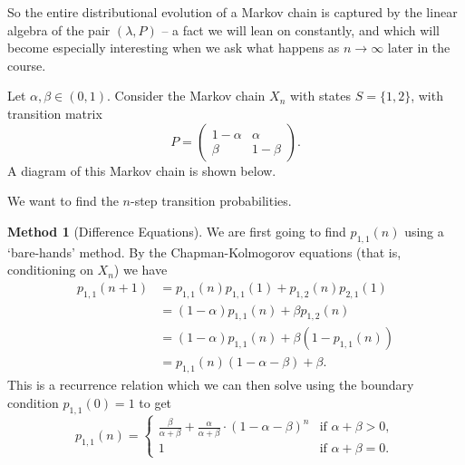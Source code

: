 So the entire distributional evolution of a Markov chain is captured by the linear algebra of the pair $(\lambda, P)$ -- a fact we will lean on constantly, and which will become especially interesting when we ask what happens as $n \rightarrow \infty$ later in the course.

\begin{example}
	Let $\alpha, \beta \in (0, 1)$. 
	Consider the Markov chain $X_n$ with states $S = \{1, 2\}$, with transition matrix 
	$$
	P = \begin{pmatrix}
		1 - \alpha & \alpha \\
		\beta & 1 - \beta
	\end{pmatrix}.
	$$
	A diagram of this Markov chain is shown below.
	\begin{center}
	\end{center}

	We want to find the $n$-step transition probabilities.

	\textbf{Method 1} (Difference Equations). We are first going to find $p_{1, 1}(n)$ using a `bare-hands' method. By the Chapman-Kolmogorov equations (that is, conditioning on $X_n$) we have
	\begin{align*}
		p_{1, 1}(n + 1) &= p_{1, 1}(n)p_{1, 1}(1) + p_{1, 2}(n) p_{2, 1}(1) \\
		&= (1 - \alpha)p_{1, 1}(n) + \beta p_{1, 2}(n) \\
		&= (1 - \alpha)p_{1, 1}(n) + \beta (1 - p_{1, 1}(n)) \\
		&= p_{1, 1}(n)(1 - \alpha - \beta) + \beta.
	\end{align*}
	This is a recurrence relation which we can then solve using the boundary condition $p_{1, 1}(0) = 1$ to get
	$$
		p_{1, 1}(n) = \begin{cases}
			\frac{\beta}{\alpha+\beta}+\frac{\alpha}{\alpha+\beta} \cdot(1-\alpha-\beta)^{n} &\mbox{if } \alpha + \beta > 0, \\
			1 &\mbox{if } \alpha + \beta = 0.
		   \end{cases}
	$$


\end{example}
